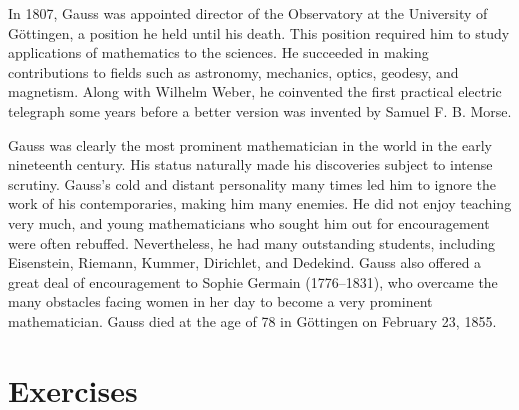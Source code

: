 In 1807, Gauss was appointed director of the Observatory at the University of G\"{o}ttingen, a position he held until his death.  This position required him to study applications of mathematics to the sciences.  He succeeded in making contributions to fields such as astronomy, mechanics, optics, geodesy, and magnetism.  Along with Wilhelm Weber, he coinvented the first practical electric telegraph some years before a better version was invented by Samuel F. B. Morse. 

Gauss was clearly the most prominent mathematician in the world in the early nineteenth century. His status naturally made his discoveries
subject to intense scrutiny.  Gauss's  cold and distant personality many times led him to ignore the work of his contemporaries, making him many enemies.  He did not enjoy teaching very much, and young mathematicians who sought him out for encouragement were often
rebuffed.  Nevertheless, he had many outstanding students, including Eisenstein, Riemann, Kummer, Dirichlet, and Dedekind. Gauss also
offered a great deal of encouragement to Sophie Germain (1776--1831), who overcame the many obstacles facing women in her day to become a very prominent mathematician.  Gauss died at the age of 78 in G\"{o}ttingen on February 23, 1855.
\histbox

 
\section*{Exercises}
\exrule

